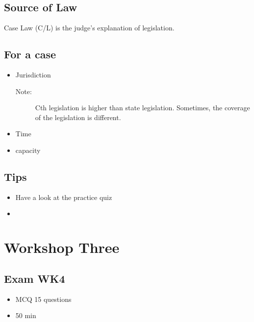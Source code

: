 \subsection*{Source of Law}
Case Law (C/L) is the judge's explanation of legislation. 

\subsection*{For a case}
\begin{itemize}
    \item Jurisdiction 
        \begin{description}
            \item[Note:] Cth legislation is higher than state legislation. Sometimes, the coverage of the legislation is different. 
        \end{description}

    \item Time

    \item capacity 
\end{itemize}

\subsection*{Tips}
\begin{itemize}
    \item Have a look at the practice quiz
    \item 
\end{itemize}


\section*{Workshop Three}
\date{March 19th 2024}
\subsection{Exam WK4}
\begin{itemize}
    \item MCQ 15 questions
    \item 50 min
\end{itemize}



